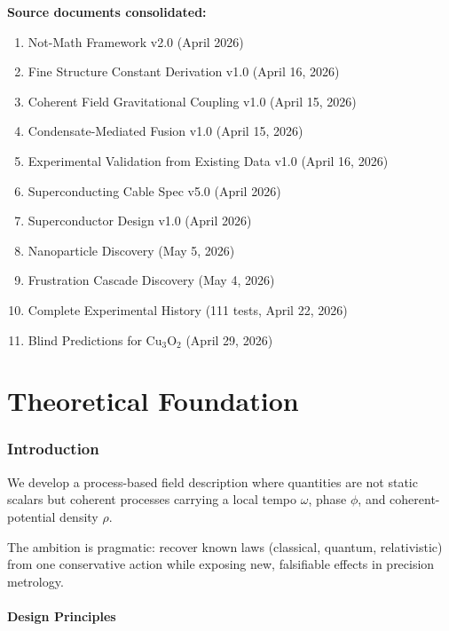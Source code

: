 \documentclass[11pt, a4paper]{article}
\begin{document}
\textbf{Source documents consolidated:}
\begin{enumerate}[nosep]
  \item Not-Math Framework v2.0 (April 2026)
  \item Fine Structure Constant Derivation v1.0 (April 16, 2026)
  \item Coherent Field Gravitational Coupling v1.0 (April 15, 2026)
  \item Condensate-Mediated Fusion v1.0 (April 15, 2026)
  \item Experimental Validation from Existing Data v1.0 (April 16, 2026)
  \item Superconducting Cable Spec v5.0 (April 2026)
  \item Superconductor Design v1.0 (April 2026)
  \item Nanoparticle Discovery (May 5, 2026)
  \item Frustration Cascade Discovery (May 4, 2026)
  \item Complete Experimental History (111 tests, April 22, 2026)
  \item Blind Predictions for Cu$_3$O$_2$ (April 29, 2026)
\end{enumerate}

\tableofcontents
\newpage


\part{Theoretical Foundation}

\section{Introduction}

We develop a process-based field description where quantities are not
static scalars but coherent processes carrying a local tempo $\omega$,
phase $\phi$, and coherent-potential density $\rho$.

The ambition is pragmatic: recover known laws (classical, quantum,
relativistic) from one conservative action while exposing new,
falsifiable effects in precision metrology.

\subsection{Design Principles}
\end{document}
